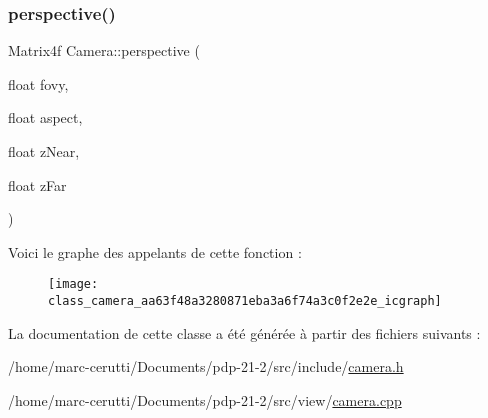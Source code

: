 \subsubsection{\texorpdfstring{perspective()}{perspective()}}
{\footnotesize\ttfamily Matrix4f Camera\+::perspective (\begin{DoxyParamCaption}\item[{float}]{fovy,  }\item[{float}]{aspect,  }\item[{float}]{z\+Near,  }\item[{float}]{z\+Far }\end{DoxyParamCaption})\hspace{0.3cm}{\ttfamily [static]}}

Voici le graphe des appelants de cette fonction \+:\nopagebreak
\begin{figure}[H]
\begin{center}
\leavevmode
\texttt{[image: class\_camera\_aa63f48a3280871eba3a6f74a3c0f2e2e\_icgraph]}
\end{center}
\end{figure}


La documentation de cette classe a été générée à partir des fichiers suivants \+:\begin{DoxyCompactItemize}
\item 
/home/marc-\/cerutti/\+Documents/pdp-\/21-\/2/src/include/\hyperlink{camera_8h}{camera.\+h}\item 
/home/marc-\/cerutti/\+Documents/pdp-\/21-\/2/src/view/\hyperlink{camera_8cpp}{camera.\+cpp}\end{DoxyCompactItemize}
